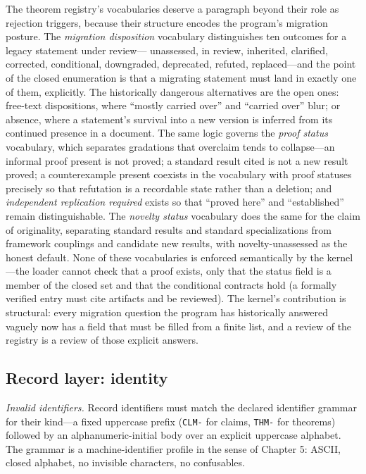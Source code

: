 The theorem registry's vocabularies deserve a paragraph beyond their
role as rejection triggers, because their structure encodes the
program's migration posture. The \emph{migration disposition} vocabulary
distinguishes ten outcomes for a legacy statement under review---
unassessed, in review, inherited, clarified, corrected, conditional,
downgraded, deprecated, refuted, replaced---and the point of the closed
enumeration is that a migrating statement must land in exactly one of
them, explicitly. The historically dangerous alternatives are the open
ones: free-text dispositions, where ``mostly carried over'' and
``carried over'' blur; or absence, where a statement's survival into a
new version is inferred from its continued presence in a document. The
same logic governs the \emph{proof status} vocabulary, which separates
gradations that overclaim tends to collapse---an informal proof present
is not proved; a standard result cited is not a new result proved; a
counterexample present coexists in the vocabulary with proof statuses
precisely so that refutation is a recordable state rather than a
deletion; and \emph{independent replication required} exists so that
``proved here'' and ``established'' remain distinguishable. The
\emph{novelty status} vocabulary does the same for the claim of
originality, separating standard results and standard specializations
from framework couplings and candidate new results, with
novelty-unassessed as the honest default. None of these vocabularies is
enforced semantically by the kernel---the loader cannot check that a
proof exists, only that the status field is a member of the closed set
and that the conditional contracts hold (a formally verified entry must
cite artifacts and be reviewed). The kernel's contribution is
structural: every migration question the program has historically
answered vaguely now has a field that must be filled from a finite
list, and a review of the registry is a review of those explicit
answers.

\subsection{Record layer: identity}

\emph{Invalid identifiers.} Record identifiers must match the declared
identifier grammar for their kind---a fixed uppercase prefix
(\texttt{CLM-} for claims, \texttt{THM-} for theorems) followed by an
alphanumeric-initial body over an explicit uppercase alphabet. The
grammar is a machine-identifier profile in the sense of Chapter 5:
ASCII, closed alphabet, no invisible characters, no confusables.

